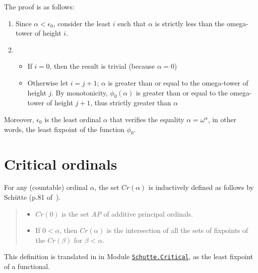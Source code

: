 {


The proof is as follows:
\begin{enumerate}
\item Since $\alpha<\epsilon_0$, consider the least $i$ such that $\alpha$ is strictly less than the omega-tower of height $i$.
\item
  \begin{itemize}
  \item If $i=0$, then the result is trivial (because $\alpha=0$)
 \item  Otherwise let $i=j+1$; 
          $\alpha$ is greater than or equal to the omega-tower of height $j$.
         By monotonicity,  $\phi_0(\alpha)$ is greater than or equal to 
        the omega-tower of height $j+1$, thus strictly greater than $\alpha$
  \end{itemize}
 \end{enumerate}

Moreover,  $\epsilon_0$ is the least ordinal $\alpha$ that verifies the equality 
$\alpha = \omega^\alpha$, in other words, the least fixpoint of the function  $\phi_0$.



\section{Critical ordinals}


For any  (countable) ordinal $\alpha$, the set $\textit{Cr}(\alpha)$ is inductively defined 
as follows by Schütte (p.81 of~\cite{schutte}).

\begin{quote}
  \begin{itemize}
  \item $\textit{Cr}(0)$ is the set \textit{AP} of additive principal ordinals.
  \item If $0<\alpha$, then $\textit{Cr}(\alpha)$ is the intersection of all the sets of fixpoints of the $\textit{Cr}(\beta)$ for $\beta<\alpha$.
  \end{itemize}
\end{quote}

This definition is translated in \coq{} in 
Module \href{../theories/html/hydras.Schutte.Critical.html}%
{\texttt{Schutte.Critical}}, as the least fixpoint of a functional. 

}
